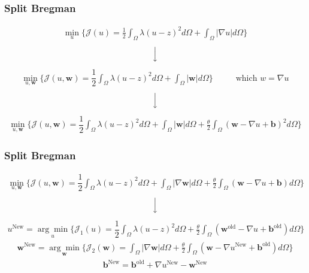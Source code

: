 \documentclass[xcolor=dvipsnames, xetex,serif]{beamer}
\begin{document}
    \begin{frame}
        \frametitle{Split Bregman}
        \begin{align*}
            \min_{u} \{ \mathcal{J}(u) = \frac{1}{2} \int_{\Omega}\lambda (u-z)^2 d\Omega +  \int_{\Omega}  |\nabla u|  d\Omega \}
        \end{align*}
        $$ \Big \downarrow$$
		\begin{align*}
		    \min_{u,\boldsymbol{w}} \{ \mathcal{J}(u,\boldsymbol{w}) = \dfrac{1}{2} \int_{\Omega} \lambda(u-z)^2 d\Omega +  \int_{\Omega}  |\boldsymbol{w}| d\Omega \} \hspace{1cm}\text{ which } w = \nabla u
        \end{align*}
        $$ \Big \downarrow$$
		\begin{align*}
		    \min_{u,\boldsymbol{w}} \{ \mathcal{J}(u,\boldsymbol{w}) = \dfrac{1}{2} \int_{\Omega} \lambda(u-z)^2 d\Omega +  \int_{\Omega}  |\boldsymbol{w}|  d\Omega + \frac{\theta}{2} \int_{\Omega} (\boldsymbol{w} - \nabla u + \boldsymbol{b})^2 d\Omega \}
        \end{align*}
        \let\thefootnote\relax{}			
	\end{frame}  	
    \begin{frame}
        \frametitle{Split Bregman}
            \begin{align*}
        \min_{u,\boldsymbol{w}} \{ \mathcal{J}(u,\boldsymbol{w}) = \dfrac{1}{2} \int_{\Omega} \lambda(u-z)^2 d\Omega +  \int_{\Omega}  |\nabla \boldsymbol{w}|  d\Omega + \frac{\theta}{2} \int_{\Omega} (\boldsymbol{w} - \nabla u + \boldsymbol{b}) d\Omega \}
        \end{align*}
        $$ \Big \downarrow$$
        \begin{align*}
        u^{\text{New}}=\underset{u}{\arg\min} \{ \mathcal{J}_1(u) = \dfrac{1}{2} \int_{\Omega} \lambda(u-z)^2 d\Omega + \frac{\theta}{2} \int_{\Omega} (\boldsymbol{w}^{\text{old}} - \nabla u + \boldsymbol{b}^{\text{old}}) d\Omega \}
        \end{align*}
        \begin{align*}
        \boldsymbol{w}^{\text{New}}=\underset{\boldsymbol{w}}{\arg\min} \{ \mathcal{J}_2(\boldsymbol{w}) = \int_{\Omega}  |\nabla \boldsymbol{w}|  d\Omega  + \frac{\theta}{2} \int_{\Omega} (\boldsymbol{w} - \nabla u^{\text{New}} + \boldsymbol{b}^{\text{old}}) d\Omega \}
        \end{align*}
        \begin{align*}
        \boldsymbol{b}^{\text{New}}=\boldsymbol{b}^{\text{old}}+\nabla u^{\text{New}}-\boldsymbol{w}^{\text{New}}
        \end{align*}
    \end{frame}  
\end{document}
